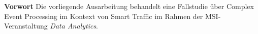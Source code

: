 \documentclass[paper,oneside,onecolumn,notitlepage,bibtotocnumbered,fontsize=12pt,bigheadings,ngerman]{scrartcl}
\newcommand{\sectionnumbering}[1]{%
  \setcounter{section}{0}%
   \renewcommand{\thesection}{\csname #1\endcsname{section}}}
\begin{document}


{\Large \textbf{Vorwort}}
\bigskip
Die vorliegende Ausarbeitung behandelt eine Fallstudie über Complex Event Processing im Kontext von Smart Traffic im Rahmen der MSI-Veranstaltung \textit{Data Analytics}.


\normalsize
\setlength{\parindent}{0pt}
\newpage
\sectionnumbering{Roman} 
\tableofcontents
\clearpage

\clearpage 

\clearpage
{} 
\sectionnumbering{arabic} 




%

\listoffigures 
\clearpage
\end{document}
